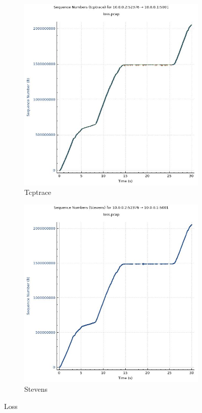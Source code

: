 \documentclass{article}
\begin{document}
\begin{figure}[htp]
    \centering
    \begin{subfigure}{.5\textwidth}
        \centering
        \includegraphics[width=\linewidth]{losstcptrace}
        \caption{Tcptrace}
    \end{subfigure}%
    \begin{subfigure}{.5\textwidth}
        \centering
        \includegraphics[width=\linewidth]{lossstevens}
        \caption{Stevens}
    \end{subfigure}
    \caption{Loss}
\end{figure}
\end{document}
